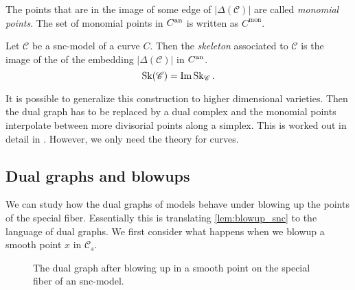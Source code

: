 \begin{definition}
	The points that are in the image of some edge of $|\Delta(\mathscr C)|$ are called \emph{monomial points}. 
	The set of monomial points in $C{}^{\text{an}}$ is written as  $C^{\text{mon}}$. 
\end{definition}
\begin{definition}
	Let $\mathscr C$ be a snc-model of a curve $C$. 
	Then the \emph{skeleton} associated to $\mathscr C$ is the image of the of the embedding $|\Delta(\mathscr C)|$ in $C{}^{\text{an}}$. 
	\[
		\operatorname{Sk}(\mathscr C) = \operatorname{Im} \operatorname{Sk}_{\mathscr C}
	.\] 
\end{definition}

\begin{remark}
	It is possible to generalize this construction to higher dimensional varieties. 
	Then the dual graph has to be replaced by a dual complex and the monomial points interpolate between more divisorial points along a simplex.
	This is worked out in detail in \cite{mustataWeightFunctionsNonArchimedean2015}. 
	However, we only need the theory for curves. 
\end{remark}


\subsection{Dual graphs and blowups} \label{sec:dual_graphs_and_blowups}
We can study how the dual graphs of models behave under blowing up the points of the special fiber.
Essentially this is translating \cref{lem:blowup_snc} to the language of dual graphs.
We first consider what happens when we blowup a smooth point $x$ in $\mathscr C_s$.

\begin{figure}[ht]
    \centering
    \caption{The dual graph after blowing up in a smooth point on the special fiber of an snc-model. }
    \label{fig:blowup-smooth-point-skeleton}
\end{figure}




